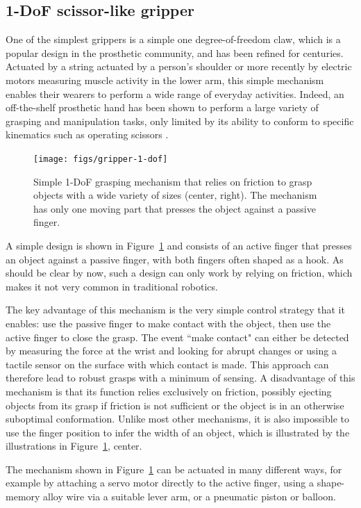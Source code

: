 \subsection{1-DoF scissor-like gripper}
One of the simplest grippers is a simple one degree-of-freedom claw, which is a popular design in the prosthetic community, and has been refined for centuries. Actuated by a string actuated by a person's shoulder or more recently by electric motors measuring muscle activity in the lower arm, this simple mechanism enables their wearers to perform a wide range of everyday activities. Indeed, an off-the-shelf prosthetic hand has been shown to perform a large variety of grasping and manipulation tasks, only limited by its ability to conform to specific kinematics such as operating scissors \cite{patel2016manipulation}.

\begin{figure}
\texttt{[image: figs/gripper-1-dof]}
\caption{Simple 1-DoF grasping mechanism that relies on friction to grasp objects with a wide variety of sizes (center, right). The mechanism has only one moving part that presses the object against a passive finger. \label{fig:gripper-1-dof}}
\end{figure}

A simple design is shown in Figure~\ref{fig:gripper-1-dof} and consists of an active finger that presses an object against a passive finger, with both fingers often shaped as a hook. As should be clear by now, such a design can only work by relying on friction, which makes it not very common in traditional robotics. 

The key advantage of this mechanism is the very simple control strategy that it enables: use the passive finger to make contact with the object, then use the active finger to close the grasp. The event ``make contact" can either be detected by measuring the force at the wrist and looking for abrupt changes or using a tactile sensor on the surface with which contact is made. This approach can therefore lead to robust grasps with a minimum of sensing. A disadvantage of this mechanism is that its function relies exclusively on friction, possibly ejecting objects from its grasp if friction is not sufficient or the object is in an otherwise suboptimal conformation. Unlike most other mechanisms, it is also impossible to use the finger position to infer the width of an object, which is illustrated by the illustrations in Figure~\ref{fig:gripper-1-dof}, center. 

The mechanism shown in Figure~\ref{fig:gripper-1-dof} can be actuated in many different ways, for example by attaching a servo motor directly to the active finger, using a shape-memory alloy wire via a suitable lever arm, or a pneumatic piston or balloon.

